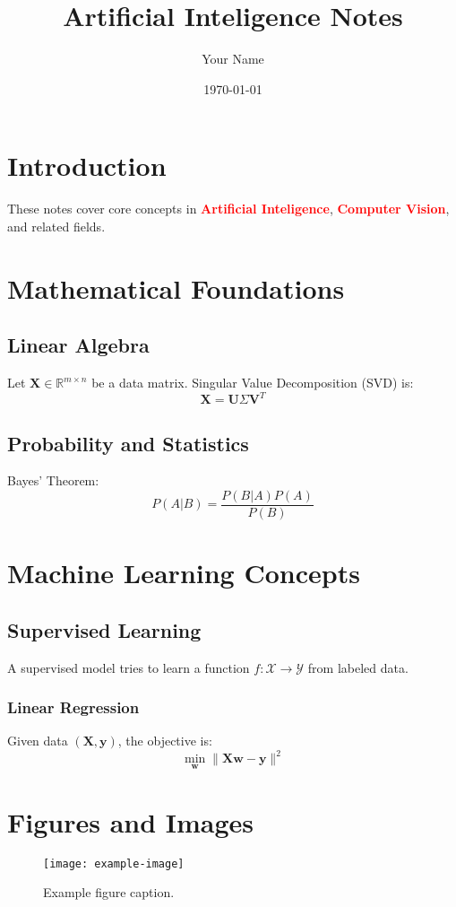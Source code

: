 \documentclass[11pt,a4paper]{article}
\title{Artificial Inteligence Notes}
\author{Your Name}
\date{\today}
\newcommand{\important}[1]{\textcolor{red}{\textbf{#1}}}
\begin{document}
\maketitle
\tableofcontents
\newpage


\section{Introduction}
These notes cover core concepts in \important{Artificial Inteligence}, \important{Computer Vision}, and related fields.

\section{Mathematical Foundations}

\subsection{Linear Algebra}
Let $\mathbf{X} \in \mathbb{R}^{m \times n}$ be a data matrix. Singular Value Decomposition (SVD) is:
\[
\mathbf{X} = \mathbf{U} \Sigma \mathbf{V}^T
\]

\subsection{Probability and Statistics}
Bayes' Theorem:
\[
P(A|B) = \frac{P(B|A) P(A)}{P(B)}
\]

\section{Machine Learning Concepts}

\subsection{Supervised Learning}
A supervised model tries to learn a function $f: \mathcal{X} \to \mathcal{Y}$ from labeled data.

\subsubsection{Linear Regression}
Given data $(\mathbf{X}, \mathbf{y})$, the objective is:
\[
\min_{\mathbf{w}} \|\mathbf{Xw} - \mathbf{y}\|^2
\]

\section{Figures and Images}
\begin{figure}[H]
    \centering
    \texttt{[image: example-image]}
    \caption{Example figure caption.}
    \label{fig:example}
\end{figure}
\end{document}

